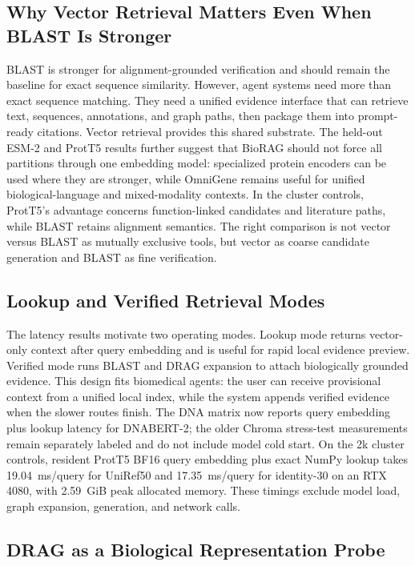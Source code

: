 \documentclass[11pt]{article}
\begin{document}
\subsection{Why Vector Retrieval Matters Even When BLAST Is Stronger}

BLAST is stronger for alignment-grounded verification and should remain the baseline for exact sequence similarity. However, agent systems need more than exact sequence matching. They need a unified evidence interface that can retrieve text, sequences, annotations, and graph paths, then package them into prompt-ready citations. Vector retrieval provides this shared substrate. The held-out ESM-2 and ProtT5 results further suggest that BioRAG should not force all partitions through one embedding model: specialized protein encoders can be used where they are stronger, while OmniGene remains useful for unified biological-language and mixed-modality contexts. In the cluster controls, ProtT5's advantage concerns function-linked candidates and literature paths, while BLAST retains alignment semantics. The right comparison is not vector versus BLAST as mutually exclusive tools, but vector as coarse candidate generation and BLAST as fine verification.

\subsection{Lookup and Verified Retrieval Modes}

The latency results motivate two operating modes. Lookup mode returns vector-only context after query embedding and is useful for rapid local evidence preview. Verified mode runs BLAST and DRAG expansion to attach biologically grounded evidence. This design fits biomedical agents: the user can receive provisional context from a unified local index, while the system appends verified evidence when the slower routes finish. The DNA matrix now reports query embedding plus lookup latency for DNABERT-2; the older Chroma stress-test measurements remain separately labeled and do not include model cold start. On the 2k cluster controls, resident ProtT5 BF16 query embedding plus exact NumPy lookup takes 19.04~ms/query for UniRef50 and 17.35~ms/query for identity-30 on an RTX 4080, with 2.59~GiB peak allocated memory. These timings exclude model load, graph expansion, generation, and network calls.

\subsection{DRAG as a Biological Representation Probe}
\end{document}
